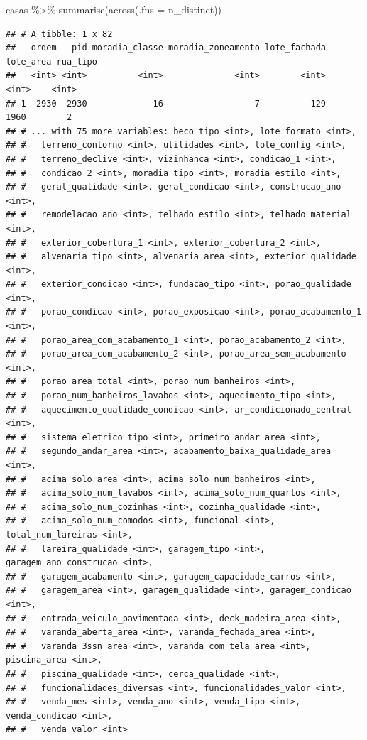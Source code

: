 \documentclass[
]{book}
\newenvironment{Shaded}{\begin{snugshade}}{\end{snugshade}}
\newcommand{\AttributeTok}[1]{\textcolor[rgb]{0.77,0.63,0.00}{#1}}
\newcommand{\FunctionTok}[1]{\textcolor[rgb]{0.00,0.00,0.00}{#1}}
\newcommand{\NormalTok}[1]{#1}
\newcommand{\SpecialCharTok}[1]{\textcolor[rgb]{0.00,0.00,0.00}{#1}}
\begin{document}
\begin{Shaded}
\begin{Highlighting}[]
\NormalTok{casas }\SpecialCharTok{\%\textgreater{}\%} 
  \FunctionTok{summarise}\NormalTok{(}\FunctionTok{across}\NormalTok{(}\AttributeTok{.fns =}\NormalTok{ n\_distinct))}
\end{Highlighting}
\end{Shaded}

\begin{verbatim}
## # A tibble: 1 x 82
##   ordem   pid moradia_classe moradia_zoneamento lote_fachada lote_area rua_tipo
##   <int> <int>          <int>              <int>        <int>     <int>    <int>
## 1  2930  2930             16                  7          129      1960        2
## # ... with 75 more variables: beco_tipo <int>, lote_formato <int>,
## #   terreno_contorno <int>, utilidades <int>, lote_config <int>,
## #   terreno_declive <int>, vizinhanca <int>, condicao_1 <int>,
## #   condicao_2 <int>, moradia_tipo <int>, moradia_estilo <int>,
## #   geral_qualidade <int>, geral_condicao <int>, construcao_ano <int>,
## #   remodelacao_ano <int>, telhado_estilo <int>, telhado_material <int>,
## #   exterior_cobertura_1 <int>, exterior_cobertura_2 <int>,
## #   alvenaria_tipo <int>, alvenaria_area <int>, exterior_qualidade <int>,
## #   exterior_condicao <int>, fundacao_tipo <int>, porao_qualidade <int>,
## #   porao_condicao <int>, porao_exposicao <int>, porao_acabamento_1 <int>,
## #   porao_area_com_acabamento_1 <int>, porao_acabamento_2 <int>,
## #   porao_area_com_acabamento_2 <int>, porao_area_sem_acabamento <int>,
## #   porao_area_total <int>, porao_num_banheiros <int>,
## #   porao_num_banheiros_lavabos <int>, aquecimento_tipo <int>,
## #   aquecimento_qualidade_condicao <int>, ar_condicionado_central <int>,
## #   sistema_eletrico_tipo <int>, primeiro_andar_area <int>,
## #   segundo_andar_area <int>, acabamento_baixa_qualidade_area <int>,
## #   acima_solo_area <int>, acima_solo_num_banheiros <int>,
## #   acima_solo_num_lavabos <int>, acima_solo_num_quartos <int>,
## #   acima_solo_num_cozinhas <int>, cozinha_qualidade <int>,
## #   acima_solo_num_comodos <int>, funcional <int>, total_num_lareiras <int>,
## #   lareira_qualidade <int>, garagem_tipo <int>, garagem_ano_construcao <int>,
## #   garagem_acabamento <int>, garagem_capacidade_carros <int>,
## #   garagem_area <int>, garagem_qualidade <int>, garagem_condicao <int>,
## #   entrada_veiculo_pavimentada <int>, deck_madeira_area <int>,
## #   varanda_aberta_area <int>, varanda_fechada_area <int>,
## #   varanda_3ssn_area <int>, varanda_com_tela_area <int>, piscina_area <int>,
## #   piscina_qualidade <int>, cerca_qualidade <int>,
## #   funcionalidades_diversas <int>, funcionalidades_valor <int>,
## #   venda_mes <int>, venda_ano <int>, venda_tipo <int>, venda_condicao <int>,
## #   venda_valor <int>
\end{verbatim}
\end{document}
